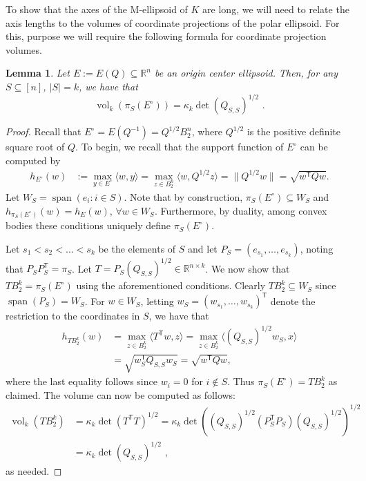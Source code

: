 \documentclass[12pt]{article}
\newtheorem{lemma}{Lemma}
\newcommand{\R}{{\mathbb{R}}}
\newcommand{\T}{\mathsf T}
\newcommand{\inner}[2]{\langle #1, #2 \rangle}
\DeclareMathOperator{\vol}{vol}
\DeclareMathOperator{\lspan}{span}
\begin{document}
To show that the axes of the M-ellipsoid of $K$ are long, we will need to relate
the axis lengths to the volumes of coordinate projections of the polar
ellipsoid. For this, purpose we will require the following formula for
coordinate projection volumes. 

\begin{lemma}\label{lem:ellipsoid-volumes}
Let $E := E(Q) \subseteq \R^n$ be an origin center ellipsoid. Then, for any
$S \subseteq [n]$, $|S| = k$, we have that 
\[
\vol_k(\pi_S(E^\circ)) = \kappa_k \det(Q_{S,S})^{1/2} \text{ .}
\]
\end{lemma}
\begin{proof}
Recall that $E^\circ = E(Q^{-1}) = Q^{1/2} B_2^n$, where $Q^{1/2}$ is the
positive definite square root of $Q$. To begin, we recall that the support
function of $E^\circ$ can be computed by
\begin{align*}
h_{E^\circ}(w) &:= \max_{y \in E^\circ} \inner{w}{y} 
               = \max_{z \in B_2^n} \inner{w}{Q^{1/2} z} 
               = \|Q^{1/2} w\| = \sqrt{w^\T Q w}.
\end{align*}
Let $W_S = \lspan(e_i: i \in S)$. Note that by construction, $\pi_S(E^\circ)
\subseteq W_S$ and $h_{\pi_S(E^\circ)}(w) = h_{E}(w)$, $\forall w \in W_S$.
Furthermore, by duality, among convex bodies these conditions uniquely define $\pi_S(E^\circ)$. 

Let $s_1 < s_2 < \dots < s_k$ be the elements of $S$ and let $P_S =
(e_{s_1},\dots,e_{s_k})$, noting that $P_S P_S^\T = \pi_S$. Let $T = P_S
(Q_{S,S})^{1/2} \in \R^{n \times k}$. We now show that $TB_2^k = \pi_S(E^\circ)$
using the aforementioned conditions. Clearly $TB_2^k \subseteq W_S$ since
$\lspan(P_S) = W_S$. For $w \in W_S$, letting $w_S = (w_{s_1},\dots,w_{s_k})^\T$
denote the restriction to the coordinates in $S$, we have that 
\begin{align*}
h_{TB_2^k}(w) &= \max_{z \in B_2^k} \inner{T^\T w}{z} 
              = \max_{z \in B_2^k} \inner{(Q_{S,S})^{1/2} w_S}{x} \\ 
              &= \sqrt{w_S^\T Q_{S,S} w_S} = \sqrt{w^\T Q w} ,
\end{align*} 
where the last equality follows since $w_i = 0$ for $i \notin S$. Thus
$\pi_S(E^\circ) = TB_2^k$ as claimed. The volume can now be computed as follows:
\begin{align*}
\vol_k(TB_2^k) &= \kappa_k \det(T^\T T)^{1/2} 
               = \kappa_k \det((Q_{S,S})^{1/2} (P_S^\T P_S)
(Q_{S,S})^{1/2})^{1/2} \\
               &= \kappa_k \det(Q_{S,S})^{1/2} \text{ ,}
\end{align*}
as needed.
\end{proof}
\end{document}

